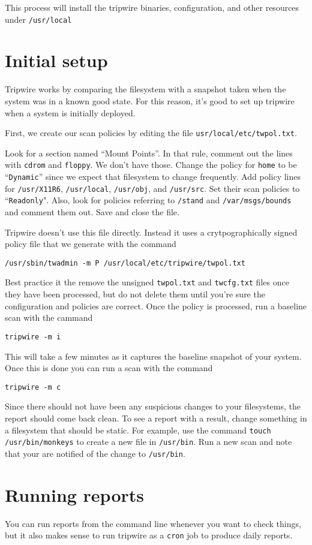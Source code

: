 \documentclass{article}
\begin{document}
This process will install the tripwire binaries, configuration, and other resources under \texttt{/usr/local}

\section{Initial setup}
Tripwire works by comparing the filesystem with a snapshot taken when the system was in a known good state.  For this reason, it's good to set up tripwire when a system is initially deployed.

First, we create our scan policies by editing the file \texttt{usr/local/etc/twpol.txt}.

Look for a section named ``Mount Points''. In that rule, comment out the lines with \texttt{cdrom} and \texttt{floppy}. We don't have those.  Change the policy for 
\texttt{home} to be ``\texttt{Dynamic}'' since we expect that filesystem to change frequently.  Add policy lines for \texttt{/usr/X11R6}, \texttt{/usr/local}, \texttt{/usr/obj}, and \texttt{/usr/src}.  Set their scan policies to ``\texttt{Readonly}". Also, look for policies referring to \texttt{/stand} and \texttt{/var/msgs/bounds} and comment them out. Save and close the file.

Tripwire doesn't use this file directly.  Instead it uses a crytpographically signed policy file that we generate with the command

\begin{verbatim}
/usr/sbin/twadmin -m P /usr/local/etc/tripwire/twpol.txt
\end{verbatim}

Best practice it the remove the unsigned \texttt{twpol.txt} and \texttt{twcfg.txt} files once they have been processed, but do not delete them until you're sure the configuration and policies are correct.  Once the policy is processed, run a baseline scan with the cammand

\begin{verbatim}
tripwire -m i
\end{verbatim}

This will take a few minutes as it captures the baseline snapshot of your system.  Once this is done you can run a scan with the command

\begin{verbatim}
tripwire -m c
\end{verbatim}

Since there should not have been any suspicious changes to your filesystems, the report should come back clean.  To see a report with a result, change something in a filesystem that should be static.  For example, use the command \texttt{touch /usr/bin/monkeys} to create a new file in \texttt{/usr/bin}.  Run a new scan and note that your are notified of the change to \texttt{/usr/bin}.


\section{Running reports}
You can run reports from the command line whenever you want to check things, but it also makes sense to run tripwire as a \texttt{cron} job to produce daily reports.
\end{document}
